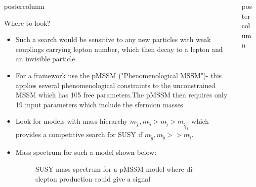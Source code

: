 \documentclass[final,hyperref={pdfpagelabels=false}]{beamer}
\newlength{\columnheight}
\begin{document}
\begin{frame}
\begin{columns}
\begin{column}{.49\textwidth}
\begin{beamercolorbox}[center,wd=\textwidth]{postercolumn}
\begin{minipage}[T]{.95\textwidth}
{	\begin{block}{Where to look?}
	\begin{itemize}
	\item Such a search would be sensitive to any new particles with weak couplings carrying lepton number, which then decay to a lepton and an invisible particle.
	\item For a framework use the pMSSM ("Phenomenological MSSM")- this applies several phenomenological constraints to the unconstrained MSSM which has 105 free parameters.The pMSSM then requires only 19 input parameters which include the sfermion masses.
	\item Look for models with mass hierarchy $m_{\tilde{\chi}}, m_{\tilde{q}}>m_{\tilde{l}}>m_{\tilde{\chi}_{1}^{0}}$ which provides a competitive search for SUSY if $m_{\tilde{g}},m_{\tilde{q}}>>m_{\tilde{l}}$.
	\item Mass spectrum for such a model shown below:
	\begin{center}
	    \begin{figure}[htbp]
               
               \caption{SUSY mass spectrum for a pMSSM model where di-slepton production could give a signal}
	      \label{fig:example}

	 \end{figure}
	\end{center}

	
	
	\end{itemize}
	
	
	
	\end{block}
	
	
            }
        \end{minipage}
      \end{beamercolorbox}
    \end{column}

    \begin{column}{.49\textwidth}
      \begin{beamercolorbox}[center,wd=\textwidth]{postercolumn}
        \begin{minipage}[T]{.95\textwidth} %
          \parbox[t][\columnheight]{\textwidth}{ %
            
}
\end{minipage}
\end{beamercolorbox}
\end{column}
\end{columns}
\end{frame}
\end{document}

